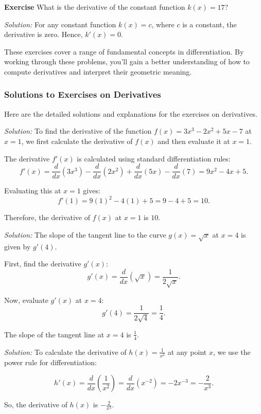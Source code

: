 \documentclass[a4paper,12pt]{book}
\newenvironment{exercise}[1][]
  {\par\medskip\noindent\textbf{Exercise #1} \rmfamily}
  {\medskip}
\newcounter{problem}
\newenvironment{solution}[1][]
{\par\noindent\textit{Solution:} \rmfamily}{\medskip}
\begin{document}
\begin{exercise}
What is the derivative of the constant function \( k(x) = 17 \)?
\end{exercise}

\begin{solution}
For any constant function \( k(x) = c \), where \( c \) is a constant, the derivative is zero. Hence, \( k'(x) = 0 \).
\end{solution}

These exercises cover a range of fundamental concepts in differentiation. By working through these problems, you'll gain a better understanding of how to compute derivatives and interpret their geometric meaning.

\subsubsection*{Solutions to Exercises on Derivatives}

Here are the detailed solutions and explanations for the exercises on derivatives.

\begin{solution}[to Exercise 1]
To find the derivative of the function \( f(x) = 3x^3 - 2x^2 + 5x - 7 \) at \( x = 1 \), we first calculate the derivative of \( f(x) \) and then evaluate it at \( x = 1 \).

The derivative \( f'(x) \) is calculated using standard differentiation rules:
\[ f'(x) = \frac{d}{dx}(3x^3) - \frac{d}{dx}(2x^2) + \frac{d}{dx}(5x) - \frac{d}{dx}(7) = 9x^2 - 4x + 5. \]

Evaluating this at \( x = 1 \) gives:
\[ f'(1) = 9(1)^2 - 4(1) + 5 = 9 - 4 + 5 = 10. \]

Therefore, the derivative of \( f(x) \) at \( x = 1 \) is \( 10 \).
\end{solution}

\begin{solution}[to Exercise 2]
The slope of the tangent line to the curve \( g(x) = \sqrt{x} \) at \( x = 4 \) is given by \( g'(4) \).

First, find the derivative \( g'(x) \):
\[ g'(x) = \frac{d}{dx}(\sqrt{x}) = \frac{1}{2\sqrt{x}}. \]

Now, evaluate \( g'(x) \) at \( x = 4 \):
\[ g'(4) = \frac{1}{2\sqrt{4}} = \frac{1}{4}. \]

The slope of the tangent line at \( x = 4 \) is \( \frac{1}{4} \).
\end{solution}

\begin{solution}[to Exercise 3]
To calculate the derivative of \( h(x) = \frac{1}{x^2} \) at any point \( x \), we use the power rule for differentiation:

\[ h'(x) = \frac{d}{dx}\left(\frac{1}{x^2}\right) = \frac{d}{dx}(x^{-2}) = -2x^{-3} = -\frac{2}{x^3}. \]

So, the derivative of \( h(x) \) is \( -\frac{2}{x^3} \).
\end{solution}
\end{document}
